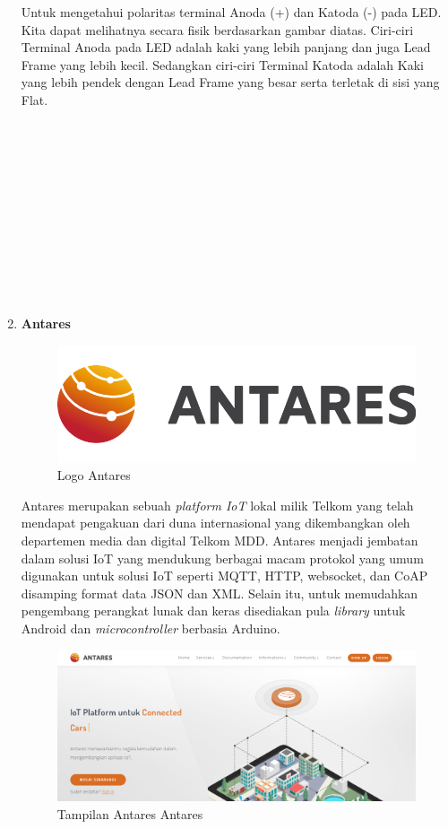 \begin{enumerate}
\par Untuk mengetahui polaritas terminal Anoda (+) dan Katoda (-) pada LED. Kita dapat melihatnya secara fisik berdasarkan gambar diatas. Ciri-ciri Terminal Anoda pada LED adalah kaki yang lebih panjang dan juga Lead Frame yang lebih kecil. Sedangkan ciri-ciri Terminal Katoda adalah Kaki yang lebih pendek dengan Lead Frame yang besar serta terletak di sisi yang Flat.
\\ \\ \\ \\ \\ \\ \\ \\ \\ \\ \\  \\

\item \textbf{Antares}
\begin{figure}[H]
\centering
\includegraphics[width=1\textwidth]{figures/antares.png}
\caption{Logo Antares}
\label{print}
\end{figure}

\par Antares merupakan sebuah \textit{platform IoT} lokal milik Telkom yang telah mendapat pengakuan dari duna internasional yang dikembangkan oleh departemen media dan digital Telkom MDD. Antares menjadi jembatan dalam solusi IoT yang mendukung berbagai macam protokol yang umum digunakan untuk solusi IoT seperti MQTT, HTTP, websocket, dan CoAP disamping format data JSON dan XML. Selain itu, untuk memudahkan pengembang perangkat lunak dan keras disediakan pula \textit{library} untuk Android dan \textit{microcontroller} berbasia Arduino.
\begin{figure}[H]
\centering
\includegraphics[width=1.1\textwidth]{figures/antares2.png}
\caption{Tampilan Antares Antares}
\label{print}
\end{figure}


\end{enumerate}
